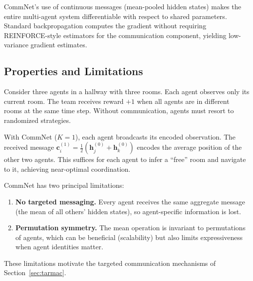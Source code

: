 \documentclass[11pt,a4paper]{article}
\begin{document}
\begin{keyresult}[title={End-to-End Differentiable Communication}]
CommNet's use of continuous messages (mean-pooled hidden states)
makes the entire multi-agent system differentiable with respect to
shared parameters.  Standard backpropagation computes the gradient
without requiring REINFORCE-style estimators for the communication
component, yielding low-variance gradient estimates.
\end{keyresult}

\subsection{Properties and Limitations}

\begin{example}
\label{ex:hallway}
Consider three agents in a hallway with three rooms.  Each agent
observes only its current room.  The team receives reward $+1$
when all agents are in different rooms at the same time step.
Without communication, agents must resort to randomized
strategies.

With CommNet ($K=1$), each agent broadcasts its encoded
observation.  The received message $\mathbf{c}_i^{(1)} =
\frac{1}{2}(\mathbf{h}_j^{(0)} + \mathbf{h}_k^{(0)})$ encodes
the average position of the other two agents.  This suffices for
each agent to infer a ``free'' room and navigate to it, achieving
near-optimal coordination.
\end{example}

\begin{remark}
\label{rem:commnet-limits}
CommNet has two principal limitations:
\begin{enumerate}[nosep]
  \item \textbf{No targeted messaging.}  Every agent receives
    the same aggregate message (the mean of all others' hidden
    states), so agent-specific information is lost.
  \item \textbf{Permutation symmetry.}  The mean operation is
    invariant to permutations of agents, which can be beneficial
    (scalability) but also limits expressiveness when agent
    identities matter.
\end{enumerate}
These limitations motivate the targeted communication mechanisms
of Section~\ref{sec:tarmac}.
\end{remark}

\end{document}
